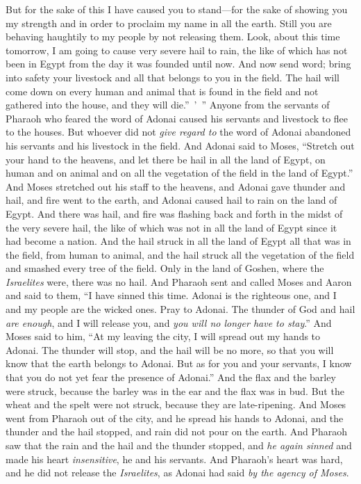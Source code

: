 \begin{biblechapter}
\verse But for the sake of this I have caused you to stand—for the sake of showing you my strength and in order to proclaim my name in all the earth.
\verse Still you are behaving haughtily to my people by not releasing them.
\verse Look, about this time tomorrow, I am going to cause very severe hail to rain, the like of which has not been in Egypt from the day it was founded until now.
\verse And now send word; bring into safety your livestock and all that belongs to you in the field. The hail will come down on every human and animal that is found in the field and not gathered into the house, and they will die.” ’ ”
\verse Anyone from the servants of Pharaoh who feared the word of Adonai caused his servants and livestock to flee to the houses.
\verse But whoever did not \textit{give regard to} the word of Adonai abandoned his servants and his livestock in the field.
\verse And Adonai said to Moses, “Stretch out your hand to the heavens, and let there be hail in all the land of Egypt, on human and on animal and on all the vegetation of the field in the land of Egypt.”
\verse And Moses stretched out his staff to the heavens, and Adonai gave thunder and hail, and fire went to the earth, and Adonai caused hail to rain on the land of Egypt.
\verse And there was hail, and fire was flashing back and forth in the midst of the very severe hail, the like of which was not in all the land of Egypt since it had become a nation.
\verse And the hail struck in all the land of Egypt all that was in the field, from human to animal, and the hail struck all the vegetation of the field and smashed every tree of the field.
\verse Only in the land of Goshen, where the \textit{Israelites} were, there was no hail.
\verse And Pharaoh sent and called Moses and Aaron and said to them, “I have sinned this time. Adonai is the righteous one, and I and my people are the wicked ones.
\verse Pray to Adonai. The thunder of God and hail \textit{are enough}, and I will release you, and \textit{you will no longer have to stay}.”
\verse And Moses said to him, “At my leaving the city, I will spread out my hands to Adonai. The thunder will stop, and the hail will be no more, so that you will know that the earth belongs to Adonai.
\verse But as for you and your servants, I know that you do not yet fear the presence of Adonai.”
\verse And the flax and the barley were struck, because the barley was in the ear and the flax was in bud.
\verse But the wheat and the spelt were not struck, because they are late-ripening.
\verse And Moses went from Pharaoh out of the city, and he spread his hands to Adonai, and the thunder and the hail stopped, and rain did not pour on the earth.
\verse And Pharaoh saw that the rain and the hail and the thunder stopped, and \textit{he again sinned} and made his heart \textit{insensitive}, he and his servants.
\verse And Pharaoh’s heart was hard, and he did not release the \textit{Israelites}, as Adonai had said \textit{by the agency of Moses}.
\end{biblechapter}

